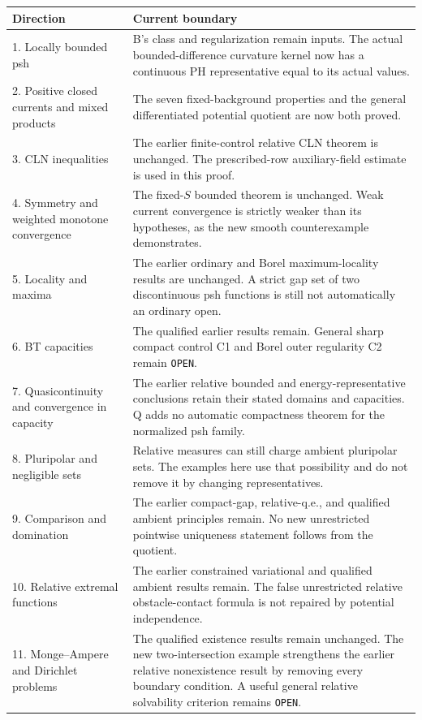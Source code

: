 \documentclass[11pt,a4paper]{article}
\numberwithin{equation}{section}
\theoremstyle{definition}
\theoremstyle{remark}
\begin{document}
\begin{longtable}{p{}p{}}
\toprule
Direction & Current boundary\\
\midrule
\endhead
1. Locally bounded psh & B's class and regularization remain
inputs. The actual bounded-difference curvature kernel now
has a continuous PH representative equal to its actual values.\\
2. Positive closed currents and mixed products & The seven
fixed-background properties and the general differentiated
potential quotient are now both proved.\\
3. CLN inequalities & The earlier finite-control relative
CLN theorem is unchanged. The prescribed-row auxiliary-field
estimate is used in this proof.\\
4. Symmetry and weighted monotone convergence & The fixed-$S$
bounded theorem is unchanged. Weak current convergence is
strictly weaker than its hypotheses, as the new smooth
counterexample demonstrates.\\
5. Locality and maxima & The earlier ordinary and Borel
maximum-locality results are unchanged. A strict gap set of
two discontinuous psh functions is still not automatically
an ordinary open.\\
6. BT capacities & The qualified earlier results remain.
General sharp compact control C1 and Borel outer regularity
C2 remain \texttt{OPEN}.\\
7. Quasicontinuity and convergence in capacity & The earlier
relative bounded and energy-representative conclusions retain
their stated domains and capacities. Q adds no automatic
compactness theorem for the normalized psh family.\\
8. Pluripolar and negligible sets & Relative measures can
still charge ambient pluripolar sets. The examples here use
that possibility and do not remove it by changing representatives.\\
9. Comparison and domination & The earlier compact-gap,
relative-q.e., and qualified ambient principles remain.
No new unrestricted pointwise uniqueness statement follows
from the quotient.\\
10. Relative extremal functions & The earlier constrained
variational and qualified ambient results remain. The false
unrestricted relative obstacle-contact formula is not repaired
by potential independence.\\
11. Monge--Ampere and Dirichlet problems & The qualified
existence results remain unchanged. The new two-intersection
example strengthens the earlier relative nonexistence result
by removing every boundary condition. A useful general relative
solvability criterion remains \texttt{OPEN}.\\
\bottomrule
\end{longtable}
\end{document}
